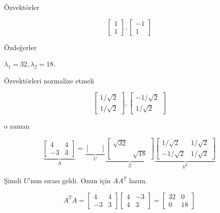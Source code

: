 \documentclass[12pt,fleqn]{article}\usepackage{../../common}
\begin{document}
Özvektörler

$$ 
\left[\begin{array}{r}
1 \\ 1
\end{array}\right],
\left[\begin{array}{r}
-1 \\ 1
\end{array}\right]
 $$

Özdeğerler

$\lambda_1=32, \lambda_2=18$. 

Özvektörleri normalize etmeli

$$ 
\left[\begin{array}{r}
1 / \sqrt{ 2} \\ 1/ \sqrt{ 2}
\end{array}\right],
\left[\begin{array}{r}
-1/ \sqrt{ 2} \\ 1/ \sqrt{ 2}
\end{array}\right]
 $$

o zaman 

$$ 
\underbrace{
\left[\begin{array}{rr}
4 & 4 \\ -3 & 3
\end{array}\right] 
}_{A}
=
\underbrace{
\left[\begin{array}{rr}
 &  \\  & 
\end{array}\right]
}_{U}
\underbrace{
\left[\begin{array}{rr}
\sqrt{ 32} &  \\  & \sqrt{ 18}
\end{array}\right]
}_{\Sigma}
\underbrace{
\left[\begin{array}{rr}
1/\sqrt{ 2} & 1/\sqrt{ 2} \\ -1/\sqrt{ 2} & 1/\sqrt{ 2}
\end{array}\right]
}_{V^T}
 $$

Şimdi $U$'nun sırası geldi. Onun için $AA^T$ lazım. 

$$ A^TA = 
\left[\begin{array}{rr}
4 & 4 \\ -3 & 3
\end{array}\right] 
\left[\begin{array}{rr}
4 & -3 \\ 4 & 3
\end{array}\right] =
\left[\begin{array}{rr}
32 & 0 \\ 0 & 18
\end{array}\right]
 $$
\end{document}
